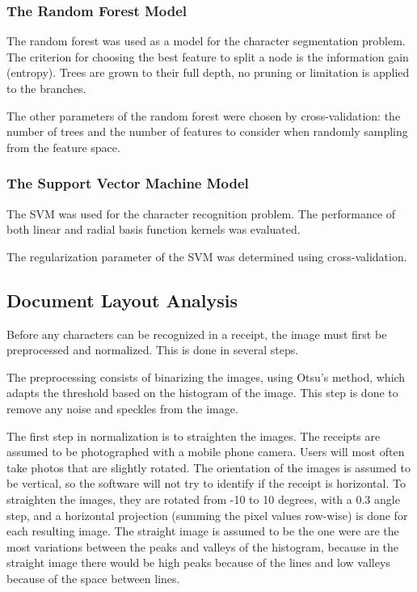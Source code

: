 \subsubsection{The Random Forest Model}
The random forest was used as a model for the character segmentation problem. The criterion for choosing the best feature to split a node is the information gain (entropy). Trees are grown to their full depth, no pruning or limitation is applied to the branches. 

The other parameters of the random forest were chosen by cross-validation: the number of trees and the number of features to consider when randomly sampling from the feature space. 

\subsubsection{The Support Vector Machine Model}
The SVM was used for the character recognition problem. The performance of both linear and radial basis function kernels was evaluated. 

The regularization parameter of the SVM was determined using cross-validation. 

\subsection{Document Layout Analysis}
Before any characters can be recognized in a receipt, the image must first be preprocessed and normalized. This is done in several steps. 

The preprocessing consists of binarizing the images, using Otsu's method\cite{otsu1975threshold}, which adapts the threshold based on the histogram of the image. This step is done to remove any noise and speckles from the image. 

The first step in normalization is to straighten the images. The receipts are assumed to be photographed with a mobile phone camera. Users will most often take photos that are slightly rotated. The orientation of the images is assumed to be vertical, so the software will not try to identify if the receipt is horizontal. To straighten the images, they are rotated from -10 to 10 degrees, with a 0.3 angle step, and a horizontal projection (summing the pixel values row-wise) is done for each resulting image. The straight image is assumed to be the one were are the most variations between the peaks and valleys of the histogram, because in the straight image there would be high peaks because of the lines and low valleys because of the space between lines. 

